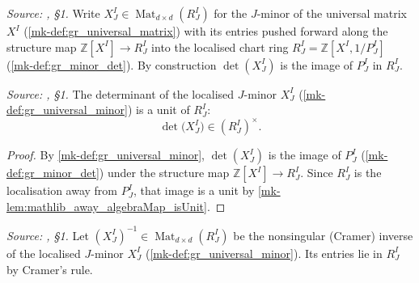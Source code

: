 \begin{definition}\label{mk-def:gr_universal_minor}
  \leanok

  \textit{Source: \cite{nitsure-hilbert-quot}, \S 1.}
  Write \(X^I_J \in \operatorname{Mat}_{d \times d}(R^I_J)\) for the \(J\)-minor of
  the universal matrix \(X^I\) (\ref{mk-def:gr_universal_matrix}) with its entries
  pushed forward along the structure map \(\mathbb{Z}[X^I] \to R^I_J\) into the
  localised chart ring \(R^I_J = \mathbb{Z}[X^I, 1/P^I_J]\)
  (\ref{mk-def:gr_minor_det}). By construction \(\det(X^I_J)\) is the image of
  \(P^I_J\) in \(R^I_J\).
\end{definition}

\begin{lemma}\label{mk-lem:gr_minorDet_unit}
  \leanok

  \textit{Source: \cite{nitsure-hilbert-quot}, \S 1.}
  The determinant of the localised \(J\)-minor \(X^I_J\)
  (\ref{mk-def:gr_universal_minor}) is a unit of \(R^I_J\):
  \[
    \det\bigl(X^I_J\bigr) \in (R^I_J)^{\times}.
  \]
\end{lemma}
\begin{proof}
  \leanok
  By \ref{mk-def:gr_universal_minor}, \(\det(X^I_J)\) is the image of \(P^I_J\)
  (\ref{mk-def:gr_minor_det}) under the structure map
  \(\mathbb{Z}[X^I] \to R^I_J\). Since \(R^I_J\) is the localisation away from
  \(P^I_J\), that image is a unit by
  \ref{mk-lem:mathlib_away_algebraMap_isUnit}.
\end{proof}

\begin{definition}\label{mk-def:gr_universalMinorInv}
  \leanok

  \textit{Source: \cite{nitsure-hilbert-quot}, \S 1.}
  Let \((X^I_J)^{-1} \in \operatorname{Mat}_{d \times d}(R^I_J)\) be the
  nonsingular (Cramer) inverse of the localised \(J\)-minor \(X^I_J\)
  (\ref{mk-def:gr_universal_minor}). Its entries lie in \(R^I_J\) by Cramer's rule.
\end{definition}

